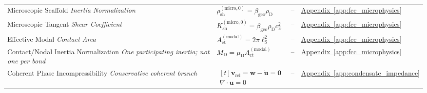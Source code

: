 \begin{longtable}{@{} p{4.5cm} p{6cm} c p{4cm} @{}}
{\raggedright Microscopic Scaffold \newline \textit{Inertia Normalization}\par} & {\raggedright $\rho_{\mathrm{sh}}^{(\mathrm{micro},0)} = \beta_{\mathrm{geo}}\rho_{\mathrm{D}}$\par} & -- & {\raggedright \hyperref[app:fcc_microphysics]{Appendix~\ref*{app:fcc_microphysics}}\par} \\

{\raggedright Microscopic Tangent \newline \textit{Shear Coefficient}\par} & {\raggedright $K_{\mathrm{sh}}^{(\mathrm{micro},0)} = \beta_{\mathrm{geo}}\rho_{\mathrm{D}}c_{\mathrm{E}}^2$\par} & -- & {\raggedright \hyperref[app:fcc_microphysics]{Appendix~\ref*{app:fcc_microphysics}}\par} \\

{\raggedright Effective Modal \newline \textit{Contact Area}\par} & {\raggedright $A_{\mathrm{ct}}^{(\mathrm{modal})} = 2\pi\ell_{\mathrm{S}}^2$\par} & -- & {\raggedright \hyperref[app:fcc_microphysics]{Appendix~\ref*{app:fcc_microphysics}}\par} \\

{\raggedright Contact/Nodal Inertia Normalization \newline \textit{One participating inertia; not one per bond}\par} & {\raggedright $M_{\mathrm D}=\mu_{\mathrm D}A_{\mathrm{ct}}^{(\mathrm{modal})}$\par} & -- & {\raggedright \hyperref[app:fcc_microphysics]{Appendix~\ref*{app:fcc_microphysics}}\par} \\

{\raggedright Coherent Phase Incompressibility \newline \textit{Conservative coherent branch}\par} & {\raggedright $\begin{gathered}[t]\mathbf v_{\mathrm{rel}}=\dot{\mathbf w}-\dot{\mathbf u}=\mathbf0 \\ \nabla\!\cdot\mathbf u=0\end{gathered}$\par} & -- & {\raggedright \hyperref[app:condensate_impedance]{Appendix~\ref*{app:condensate_impedance}}\par} \\


\end{longtable}
